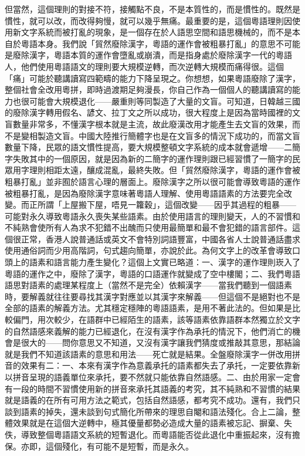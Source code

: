 \documentclass[a5paper, 12pt, openany]{book} %
\begin{document}
但當然，這個理則的對接不符，接觸點不良，不是本質性的，而是慣性的。既然是慣性，就可以改，而改得夠慢，就可以幾乎無痛。最重要的是，這個粵語理則因使用新文字系統而被打亂的現象，是一個存在於人語思空間和語思機械的，而不是本自於粵語本身。我們說「貿然廢除漢字，粵語的運作會被粗暴打亂」的意思不可能是廢除漢字，粵語本質的運作會墮亂或崩潰，而是指身處於廢除漢字一代的粵語人，他們使用粵語語文的理則要大規模逆轉，而次逆轉大規模而痛得很。這個「痛」可能於聽講讀寫四範疇的能力下降呈現之。你想想，如果粵語廢除了漢字，整個社會全改用粵拼，即時過渡期足夠漫長，你自己作為一個個人的聽講讀寫的能力也很可能會大規模退化——嚴重則等同製造了大量的文盲。可知道，日韓越三國的廢除漢字轉用假名、諺文、拉丁文之所以成功，很大程度上是因為當時國裡的文盲數量非常多，不懂漢字根本就是主流，故此廢漢改用才能產生去文盲的效果，而不是變相製造文盲。中國大陸推行簡體字也是在文盲多的情況下成功的，而當文盲數量下降，民眾的語文慣性提高，要大規模整頓文字系統的成本就會遞增——二簡字失敗其中的一個原因，就是因為新的二簡字的運作理則跟已經習慣了一簡字的民眾用字理則相距太遠，釀成混亂，最終失敗。但「貿然廢除漢字，粵語的運作會被粗暴打亂」並非囿於語言心理的層面上。廢除漢字之所以很可能會導致粵語的運作被粗暴打亂，是因為廢除漢字意味著粵語人理解、使用粵語語素的方法要完全改變。而正所謂「上屋搬下屋，唔見一籮穀」，這個改變——因乎其過程的粗暴——可能對永久導致粵語永久喪失某些語素。由於使用語言的理則變天，人的不習慣和不純熟會使所有人為求不犯錯不出醜而只使用最簡單和最不會犯錯的語言部件。這個很正常，香港人說普通話或英文不會特別詞語豐富，中國各省人士說普通話盡求使用通俗詞而少用高階詞，句式趨向簡單，亦說於此。為何文字上的改革會導致口頭上的語素和語言能力產生變化？這個上文實已略道：一、漢字的運作理則崁入了粵語的運作之中，廢除了漢字，粵語的口語運作就變成了空中樓閣；二、我們粵語語思對語素的處理某程度上（當然不是完全）依賴漢字——當我們聽到一個語素時，要解義就往往要尋找其漢字對應並以其漢字來解義——但這個不是絕對也不是全部的語素的解義方法。尤其穩定穩陣的粵語語素，是用不著此法的。但如果是比較偏門，用次較少，在語群中已經陌生的語素，該等語素依靠語群本然獨立於文字的自然語感來義解的能力已經退化，在沒有漢字作為承托的情況下，他們消亡的機會是很大的——問你意思又不知道，又沒有漢字讓我們猜度或推敲其意思，那結論就是我們不知道該語素的意思和用法——死亡就是結果。全盤廢除漢字一併改用拼音的效果有二：一、本來有漢字作為意義承托的語素都失去了承托，一定要依靠新以拼音呈現的語義單位來承托，要不然就只能依靠自然語感。二、由於用家一定會有一段的時間不習慣使用新的拼音來承托其語義的考究，其不純熟和不習慣的結果就是語義的在所有可用方法之範式，包括自然語感，都考究不成功。還有，我們只談到語素的掉失，還未談到句式簡化所帶來的理思自閹和語法殘化。合上二論，整體效果就是在這個大逆轉中，極其優量都勢必造成大量的語素被忘記、摒棄、失佚，導致整個粵語語文系統的短暫退化。而粵語能否從此退化中重振起來，沒有擔保。亦即，這個殘化，有可能不是短暫，而是永久。
\end{document}
